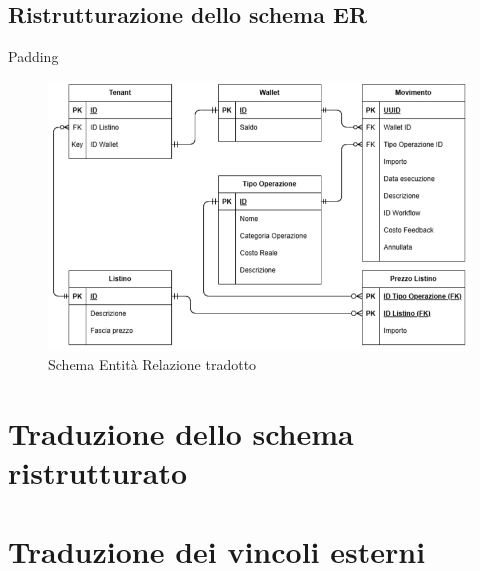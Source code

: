 \subsection{Ristrutturazione dello schema ER}
Padding

\begin{figure}[H]
  \centering
  \includegraphics[width=13cm]{images/er-diagram.jpg}
  \caption{Schema Entit\`a Relazione tradotto}
\end{figure}

\section{Traduzione dello schema ristrutturato}

\section{Traduzione dei vincoli esterni}
